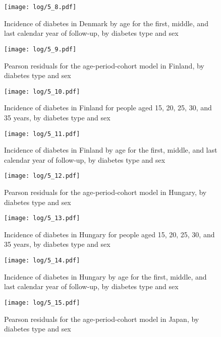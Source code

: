 \documentclass[11pt]{article}
\begin{document}
\begin{figure}
    \centering
    \texttt{[image: log/5\_8.pdf]}
    \caption{Incidence of diabetes in Denmark by age for the first, middle, and last calendar year of follow-up, by diabetes type and sex}
    \label{Denmark agespec}
\end{figure}
\begin{figure}
    \centering
    \texttt{[image: log/5\_9.pdf]}
    \caption{Pearson residuals for the age-period-cohort model in Finland, by diabetes type and sex}
    \label{Finland agespec}
\end{figure}
\begin{figure}
    \centering
    \texttt{[image: log/5\_10.pdf]}
    \caption{Incidence of diabetes in Finland for people aged 15, 20, 25, 30, and 35 years, by diabetes type and sex}
    \label{Finland agespec}
\end{figure}
\begin{figure}
    \centering
    \texttt{[image: log/5\_11.pdf]}
    \caption{Incidence of diabetes in Finland by age for the first, middle, and last calendar year of follow-up, by diabetes type and sex}
    \label{Finland agespec}
\end{figure}
\begin{figure}
    \centering
    \texttt{[image: log/5\_12.pdf]}
    \caption{Pearson residuals for the age-period-cohort model in Hungary, by diabetes type and sex}
    \label{Hungary agespec}
\end{figure}
\begin{figure}
    \centering
    \texttt{[image: log/5\_13.pdf]}
    \caption{Incidence of diabetes in Hungary for people aged 15, 20, 25, 30, and 35 years, by diabetes type and sex}
    \label{Hungary agespec}
\end{figure}
\begin{figure}
    \centering
    \texttt{[image: log/5\_14.pdf]}
    \caption{Incidence of diabetes in Hungary by age for the first, middle, and last calendar year of follow-up, by diabetes type and sex}
    \label{Hungary agespec}
\end{figure}
\begin{figure}
    \centering
    \texttt{[image: log/5\_15.pdf]}
    \caption{Pearson residuals for the age-period-cohort model in Japan, by diabetes type and sex}
    \label{Japan agespec}
\end{figure}
\end{document}
